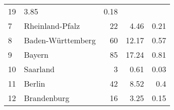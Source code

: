 \begin{longtable}{lXrrr}
       \num{19} &
       \num[round-mode=places,round-precision=2]{3.85} &
         \num[round-mode=places,round-precision=2]{0.18} \\

     7 &
     \multicolumn{1}{X}{ Rheinland-Pfalz   } &


       \num{22} &
       \num[round-mode=places,round-precision=2]{4.46} &
         \num[round-mode=places,round-precision=2]{0.21} \\

     8 &
     \multicolumn{1}{X}{ Baden-Württemberg   } &


       \num{60} &
       \num[round-mode=places,round-precision=2]{12.17} &
         \num[round-mode=places,round-precision=2]{0.57} \\

     9 &
     \multicolumn{1}{X}{ Bayern   } &


       \num{85} &
       \num[round-mode=places,round-precision=2]{17.24} &
         \num[round-mode=places,round-precision=2]{0.81} \\

     10 &
     \multicolumn{1}{X}{ Saarland   } &


       \num{3} &
       \num[round-mode=places,round-precision=2]{0.61} &
         \num[round-mode=places,round-precision=2]{0.03} \\

     11 &
     \multicolumn{1}{X}{ Berlin   } &


       \num{42} &
       \num[round-mode=places,round-precision=2]{8.52} &
         \num[round-mode=places,round-precision=2]{0.4} \\

     12 &
     \multicolumn{1}{X}{ Brandenburg   } &


       \num{16} &
       \num[round-mode=places,round-precision=2]{3.25} &
         \num[round-mode=places,round-precision=2]{0.15} \\


\end{longtable}
